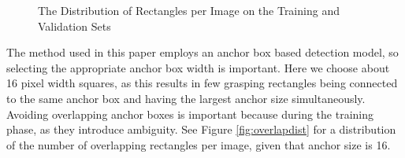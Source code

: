 \documentclass{article}
\begin{document}
\begin{figure}
\centering
{}
\qquad
{}
\caption{The Distribution of Rectangles per Image on the Training and Validation Sets}
\label{fig:recdist}
\end{figure}

The method used in this paper employs an anchor box
based detection model, so selecting the appropriate anchor box width is important.
Here we choose about 16 pixel width squares, as this results in few grasping
rectangles being connected to the same anchor box and having the largest anchor
size simultaneously. Avoiding overlapping anchor boxes is important because
during the training phase, as they introduce ambiguity.
See Figure \ref{fig:overlapdist} for a distribution of the number
of overlapping rectangles per image, given that anchor size is 16.
\end{document}
